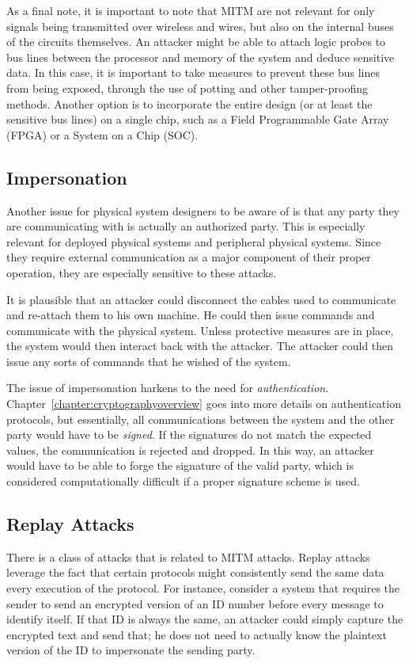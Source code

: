 As a final note, it is important to note that MITM are not relevant for only signals being transmitted over wireless and wires, but also on
the internal buses of the circuits themselves. An attacker might be able to attach logic probes to bus lines between the processor and memory
of the system and deduce sensitive data. In this case, it is important to take measures to prevent these bus lines from being exposed,
through the use of potting and other tamper-proofing methods. Another option is to incorporate the entire design (or at least the sensitive
bus lines) on a single chip, such as a Field Programmable Gate Array (FPGA) or a System on a Chip (SOC).

\subsection{Impersonation}
Another issue for physical system designers to be aware of is that any party they are communicating with is actually an authorized party.
This is especially relevant for deployed physical systems and peripheral physical systems. Since they require external communication as a
major component of their proper operation, they are especially sensitive to these attacks.

It is plausible that an attacker could disconnect the cables used to communicate and re-attach them to his own machine. He could then
issue commands and communicate with the physical system. Unless protective measures are in place, the system would then interact
back with the attacker. The attacker could then issue any sorts of commands that he wished of the system.

The issue of impersonation harkens to the need for \textit{authentication}. Chapter~\ref{chapter:cryptographyoverview} goes into more
details on authentication protocols, but essentially, all communications between the system and the other party would have to be
\textit{signed}. If the signatures do not match the expected values, the communication is rejected and dropped. In this way, an attacker
would have to be able to forge the signature of the valid party, which is considered computationally difficult if a proper signature scheme
is used.

\subsection{Replay Attacks}
There is a class of attacks that is related to MITM attacks. Replay attacks leverage the fact that certain protocols
might consistently send the same data every execution of the protocol. For instance, consider a system that requires the sender to 
send an encrypted version of an ID number
before every message to identify itself. If that ID is always the same, an attacker could simply capture the encrypted text and send
that; he does not need to actually know the plaintext version of the ID to impersonate the sending party.

